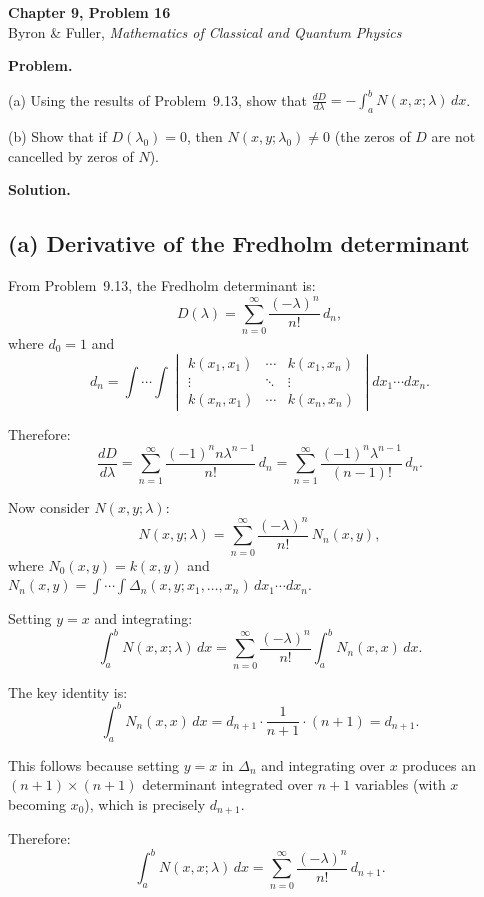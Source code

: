\documentclass[12pt]{article}
\begin{document}
\begin{center}
{\Large\bfseries Chapter 9, Problem 16}\\[6pt]
Byron \& Fuller, \textit{Mathematics of Classical and Quantum Physics}
\end{center}

\bigskip

\textbf{Problem.}

(a) Using the results of Problem~9.13, show that $\frac{dD}{d\lambda} = -\int_a^b N(x,x;\lambda)\,dx$.

(b) Show that if $D(\lambda_0) = 0$, then $N(x,y;\lambda_0) \neq 0$ (the zeros of $D$ are not cancelled by zeros of $N$).

\bigskip
\textbf{Solution.}

\subsection*{(a) Derivative of the Fredholm determinant}

From Problem~9.13, the Fredholm determinant is:
\[
D(\lambda) = \sum_{n=0}^{\infty} \frac{(-\lambda)^n}{n!}\,d_n,
\]
where $d_0 = 1$ and
\[
d_n = \int\cdots\int \begin{vmatrix} k(x_1,x_1) & \cdots & k(x_1,x_n) \\ \vdots & \ddots & \vdots \\ k(x_n,x_1) & \cdots & k(x_n,x_n) \end{vmatrix} dx_1\cdots dx_n.
\]

Therefore:
\[
\frac{dD}{d\lambda} = \sum_{n=1}^{\infty} \frac{(-1)^n n\lambda^{n-1}}{n!}\,d_n = \sum_{n=1}^{\infty} \frac{(-1)^n \lambda^{n-1}}{(n-1)!}\,d_n.
\]

Now consider $N(x,y;\lambda)$:
\[
N(x,y;\lambda) = \sum_{n=0}^{\infty} \frac{(-\lambda)^n}{n!}\,N_n(x,y),
\]
where $N_0(x,y) = k(x,y)$ and $N_n(x,y) = \int\cdots\int \Delta_n(x,y;x_1,\ldots,x_n)\,dx_1\cdots dx_n$.

Setting $y = x$ and integrating:
\[
\int_a^b N(x,x;\lambda)\,dx = \sum_{n=0}^{\infty} \frac{(-\lambda)^n}{n!}\int_a^b N_n(x,x)\,dx.
\]

The key identity is:
\[
\int_a^b N_n(x,x)\,dx = d_{n+1} \cdot \frac{1}{n+1} \cdot (n+1) = d_{n+1}.
\]

This follows because setting $y = x$ in $\Delta_n$ and integrating over $x$ produces an $(n+1) \times (n+1)$ determinant integrated over $n+1$ variables (with $x$ becoming $x_0$), which is precisely $d_{n+1}$.

Therefore:
\[
\int_a^b N(x,x;\lambda)\,dx = \sum_{n=0}^{\infty} \frac{(-\lambda)^n}{n!}\,d_{n+1}.
\]
\end{document}
